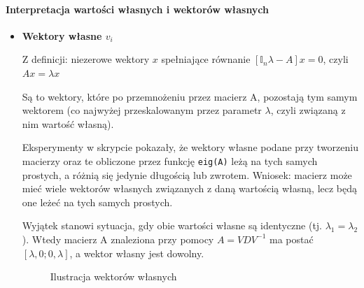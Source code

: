 \documentclass[a4paper, 12pt]{article}
\begin{document}
	\paragraph{Interpretacja wartości własnych i wektorów własnych}
	\begin{itemize}
		
		\item \textbf{Wektory własne $v_i$}
		
		Z definicji: niezerowe wektory $x$ spełniające równanie $[\mathbb{I}_n\lambda-A]x = 0$, czyli $Ax=\lambda x$
		
		Są to wektory, które po przemnożeniu przez macierz A, pozostają tym samym wektorem (co najwyżej przeskalowanym przez parametr $\lambda$, czyli związaną z nim wartość własną). 
			
		Eksperymenty w skrypcie pokazały, że wektory własne podane przy tworzeniu macierzy oraz te obliczone przez funkcję \verb|eig(A)| leżą na tych samych prostych, a różnią się jedynie długością lub zwrotem. Wniosek: macierz może mieć wiele wektorów własnych związanych z daną wartością własną, lecz będą one leżeć na tych samych prostych.
		
		Wyjątek stanowi sytuacja, gdy obie wartości własne są identyczne (tj. $\lambda _1 = \lambda _2$). Wtedy macierz A znaleziona przy pomocy $A = VDV^{-1}$ ma postać $[\lambda, 0; 0, \lambda]$, a wektor własny jest dowolny.
		
		\begin{figure}[h]
			\begin{center}
				\caption{Ilustracja wektorów własnych}
			\end{center}
		\end{figure}
		

\end{itemize}
\end{document}
